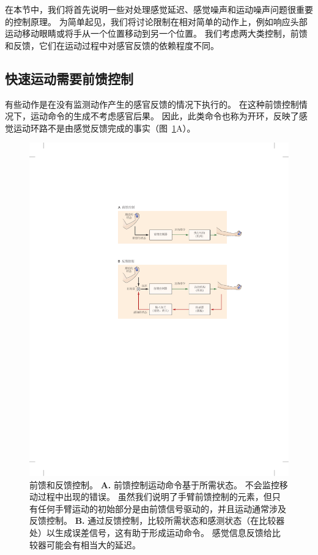 在本节中，我们将首先说明一些对处理感觉延迟、感觉噪声和运动噪声问题很重要的控制原理。
为简单起见，我们将讨论限制在相对简单的动作上，例如响应头部运动移动眼睛或将手从一个位置移动到另一个位置。
我们考虑两大类控制，前馈和反馈，它们在运动过程中对感官反馈的依赖程度不同。



\subsection{快速运动需要前馈控制}

有些动作是在没有监测动作产生的感官反馈的情况下执行的。
在这种前馈控制情况下，运动命令的生成不考虑感官后果。
因此，此类命令也称为开环，反映了感觉运动环路不是由感觉反馈完成的事实（图~\ref{fig:30_2}A）。


\begin{figure}[htbp]
	\centering
	\includegraphics[width=1.0\linewidth]{chap30/fig_30_2}
	\caption{前馈和反馈控制。
		\textbf{A.} 前馈控制运动命令基于所需状态。
		不会监控移动过程中出现的错误。
		虽然我们说明了手臂前馈控制的元素，但只有任何手臂运动的初始部分是由前馈信号驱动的，并且运动通常涉及反馈控制。
		\textbf{B.} 通过反馈控制，比较所需状态和感测状态（在比较器处）以生成误差信号，这有助于形成运动命令。
		感觉信息反馈给比较器可能会有相当大的延迟。}
	\label{fig:30_2}
\end{figure}



